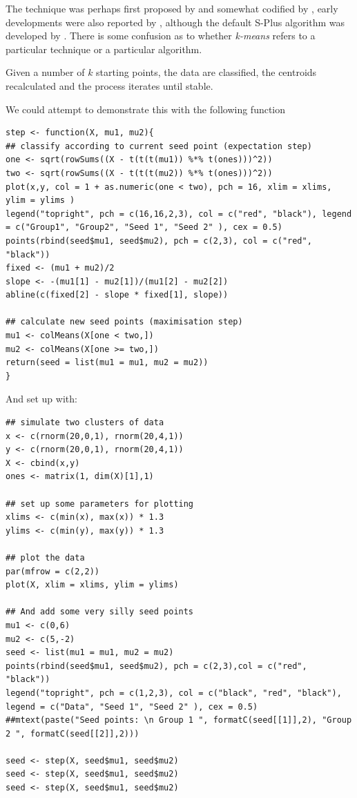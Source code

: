 The technique was perhaps first proposed by \cite{Lloyd:1957} and somewhat codified by \cite{Forgy:1965}, early developments were also reported by \cite{MacQueen:1967}, although the default S-Plus algorithm was developed by \cite{Hartigan+Wong:1979}.   There is some confusion as to whether \emph{k-means} refers to a particular technique or a particular algorithm.

Given a number of $k$ starting points, the data are classified, the centroids recalculated and the process iterates until stable.

We could attempt to demonstrate this with the following function

\singlespacing
\begin{verbatim}
step <- function(X, mu1, mu2){
## classify according to current seed point (expectation step)
one <- sqrt(rowSums((X - t(t(t(mu1)) %*% t(ones)))^2))
two <- sqrt(rowSums((X - t(t(t(mu2)) %*% t(ones)))^2))
plot(x,y, col = 1 + as.numeric(one < two), pch = 16, xlim = xlims, ylim = ylims )
legend("topright", pch = c(16,16,2,3), col = c("red", "black"), legend = c("Group1", "Group2", "Seed 1", "Seed 2" ), cex = 0.5)
points(rbind(seed$mu1, seed$mu2), pch = c(2,3), col = c("red", "black"))
fixed <- (mu1 + mu2)/2
slope <- -(mu1[1] - mu2[1])/(mu1[2] - mu2[2])
abline(c(fixed[2] - slope * fixed[1], slope))

## calculate new seed points (maximisation step)
mu1 <- colMeans(X[one < two,])
mu2 <- colMeans(X[one >= two,])
return(seed = list(mu1 = mu1, mu2 = mu2))
}
\end{verbatim}
\onehalfspacing

And set up with:

\singlespacing
\begin{verbatim}
## simulate two clusters of data
x <- c(rnorm(20,0,1), rnorm(20,4,1))
y <- c(rnorm(20,0,1), rnorm(20,4,1))
X <- cbind(x,y)
ones <- matrix(1, dim(X)[1],1)

## set up some parameters for plotting
xlims <- c(min(x), max(x)) * 1.3
ylims <- c(min(y), max(y)) * 1.3

## plot the data
par(mfrow = c(2,2))
plot(X, xlim = xlims, ylim = ylims)

## And add some very silly seed points
mu1 <- c(0,6)
mu2 <- c(5,-2)
seed <- list(mu1 = mu1, mu2 = mu2)
points(rbind(seed$mu1, seed$mu2), pch = c(2,3),col = c("red", "black"))
legend("topright", pch = c(1,2,3), col = c("black", "red", "black"), legend = c("Data", "Seed 1", "Seed 2" ), cex = 0.5)
##mtext(paste("Seed points: \n Group 1 ", formatC(seed[[1]],2), "Group 2 ", formatC(seed[[2]],2)))

seed <- step(X, seed$mu1, seed$mu2)
seed <- step(X, seed$mu1, seed$mu2)
seed <- step(X, seed$mu1, seed$mu2)
\end{verbatim}
\onehalfspacing

